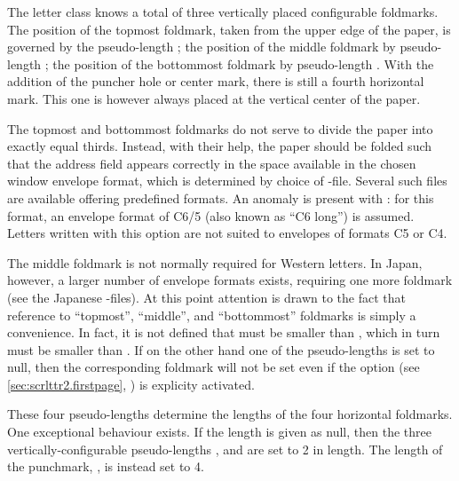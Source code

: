 \begin{Declaration}
\end{Declaration}
The letter class  knows a total of three vertically placed
configurable foldmarks. The position of the topmost foldmark, taken from the
upper edge of the paper, is governed by the pseudo-length
; the position of the middle foldmark by pseudo-length
; the position of
the bottommost foldmark by pseudo-length . With the
addition of the puncher hole or center mark, there is still a fourth horizontal
mark. This one is however always placed at the vertical center of the paper.
\iffalse%
There's no pseudo-length for this last mark, because it vertical position is
not configurable.  \fi

The topmost and bottommost foldmarks do not serve to
divide the paper into exactly equal thirds. Instead, with their help, the
paper should be folded such that the address field appears correctly in the
space available in the chosen window envelope format, which is determined by
choice of -file. Several such files are available offering
predefined formats. An anomaly is present with : for this
format, an envelope format of C6/5 (also known as ``C6 long'') is
assumed. Letters written with this option are not suited to envelopes of
formats C5 or C4.

The middle foldmark is not normally required for Western letters. In Japan,
however, a larger number of envelope formats exists, requiring one more
foldmark (see the Japanese -files). At this point attention is drawn
to the fact that reference to ``topmost'', ``middle'', and ``bottommost''
foldmarks is simply a convenience. In fact, it is not defined that
 must be smaller than , which in
turn must be smaller than . If on the other hand one of
the pseudo-lengths is set to null, then the corresponding foldmark will not be
set even if the option
%
 (see \autoref{sec:scrlttr2.firstpage},
) is explicity activated.
%
\EndIndexGroup


\begin{Declaration}
\end{Declaration}
These four pseudo-lengths determine the
lengths of the four horizontal foldmarks. One
exceptional behaviour exists. If the length is given as null, then the three
vertically-configurable pseudo-lengths ,
 and  are set to 2
in length. The length of the punchmark, , is instead
set to 4.%
\EndIndexGroup


